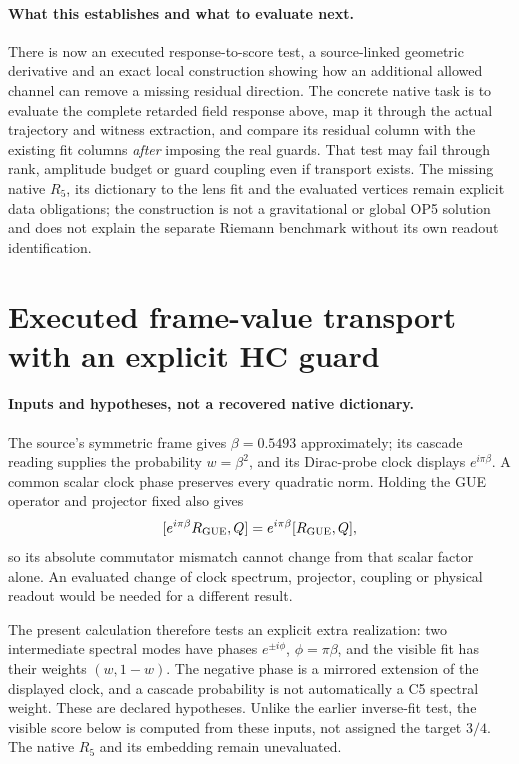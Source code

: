 \documentclass[11pt,a4paper]{article}
\begin{document}
\paragraph{What this establishes and what to evaluate next.}
There is now an executed response-to-score test, a source-linked
geometric derivative and an exact local construction showing how
an additional allowed channel can remove a missing residual
direction. The concrete native task is to evaluate the complete
retarded field response above, map it through the actual trajectory
and witness extraction, and compare its residual column with the
existing fit columns \emph{after} imposing the real guards.
That test may fail through rank, amplitude budget or guard coupling
even if transport exists. The missing native $R_5$, its dictionary
to the lens fit and the evaluated vertices remain explicit data
obligations; the construction is not a gravitational or global
OP5 solution and does not explain the separate Riemann benchmark
without its own readout identification.

\section{Executed frame-value transport with an explicit HC guard}
\label{sec:frame-value-hc-transport}

\paragraph{Inputs and hypotheses, not a recovered native dictionary.}
The source's symmetric frame gives $\beta=0.5493$ approximately;
its cascade reading supplies the probability $w=\beta^2$, and its
Dirac-probe clock displays $e^{i\pi\beta}$. A common scalar clock
phase preserves every quadratic norm. Holding the GUE operator and
projector fixed also gives
\[
 [e^{i\pi\beta}R_{\rm GUE},Q]
   =e^{i\pi\beta}[R_{\rm GUE},Q],
\]
so its absolute commutator mismatch cannot change from that scalar
factor alone. An evaluated change of clock spectrum, projector,
coupling or physical readout would be needed for a different result.

The present calculation therefore tests an explicit extra realization:
two intermediate spectral modes have phases $e^{\pm i\phi}$,
$\phi=\pi\beta$, and the visible fit has their weights $(w,1-w)$.
The negative phase is a mirrored extension of the displayed clock,
and a cascade probability is not automatically a C5 spectral weight.
These are declared hypotheses. Unlike the earlier inverse-fit test,
the visible score below is computed from these inputs, not assigned
the target $3/4$. The native $R_5$ and its embedding remain unevaluated.
\end{document}
